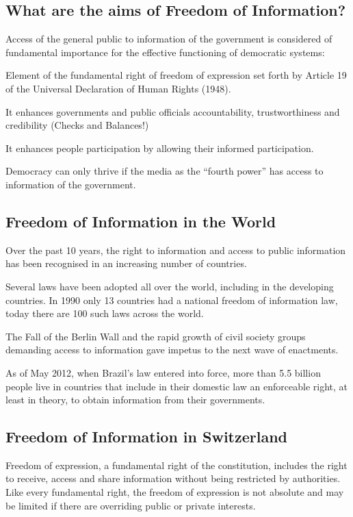 \subsection{What are the aims of Freedom of Information?}
Access of the general public to information of the government is considered	of fundamental importance for the effective functioning of democratic systems:
\begin{compactenum}
	\item Element of the fundamental right of freedom of expression set forth by Article 19 of the Universal Declaration of Human Rights (1948).
	\item It enhances governments and public officials accountability, trustworthiness and credibility (Checks and Balances!)
	\item It enhances people participation by allowing their informed participation.
	\item Democracy can only thrive if the media as the “fourth power” has access to information of the government.
\end{compactenum}

\subsection{Freedom of Information in the World}
\begin{compactitem}
	\item Over the past 10 years, the right to information and access to public information has been recognised in an increasing number of countries.
	\item Several laws have been adopted all over the world, including in the developing countries. In 1990 only 13 countries had a national freedom of	information law, today there are 100 such laws across the world.
	\item The Fall of the Berlin Wall and the rapid growth of civil society groups demanding access to information gave impetus to the next wave of	enactments.
	\item As of May 2012, when Brazil's law entered into force, more than 5.5 billion people live in countries that include in their domestic law an enforceable right, at least in theory, to obtain information from their governments.
\end{compactitem}

\subsection{Freedom of Information in Switzerland}
Freedom of expression, a fundamental right of the constitution, includes the right to receive, access and share information without being restricted by authorities.\\
Like every fundamental right, the freedom of expression is not absolute and may be limited if there are overriding public or private interests.

